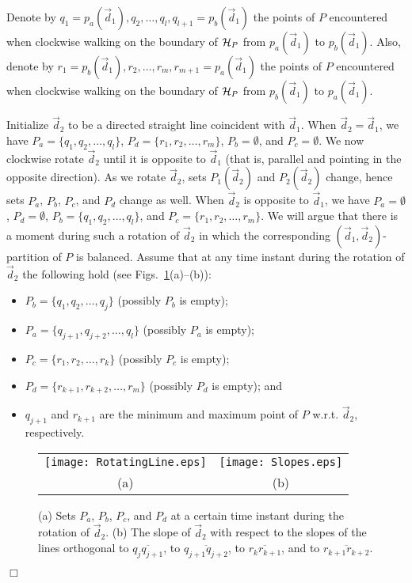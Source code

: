 \documentclass{llncs}
\renewenvironment{proof}
{{\bf Proof:}}{\hspace*{\fill}$\Box$\par\vspace{2mm}}
\begin{document}
\begin{proof}
Denote by $q_1=p_a({\vec d}_1),q_2,\dots,q_l,q_{l+1}=p_b({\vec d}_1)$ the points of $P$ encountered when clockwise walking on the boundary of ${\cal H}_P$ from $p_a({\vec d}_1)$ to $p_b({\vec d}_1)$. Also, denote by $r_1=p_b({\vec d}_1),r_2,\dots,r_m,r_{m+1}=p_a({\vec d}_1)$ the points of $P$ encountered when clockwise walking on the boundary of ${\cal H}_P$ from $p_b({\vec d}_1)$ to $p_a({\vec d}_1)$.

Initialize ${\vec d}_2$ to be a directed straight line coincident with ${\vec d}_1$. When ${\vec d}_2={\vec d}_1$, we have $P_a=\{q_1,q_2,\dots,q_l\}$, $P_d=\{r_1,r_2,\dots,r_m\}$, $P_b=\emptyset$, and $P_c=\emptyset$. We now clockwise rotate ${\vec d}_2$ until it is opposite to ${\vec d}_1$ (that is, parallel and pointing in the opposite direction). As we rotate ${\vec d}_2$, sets $P_{1}({\vec d}_2)$ and $P_{2}({\vec d}_2)$ change, hence sets $P_a$, $P_b$, $P_c$, and $P_d$ change as well. When ${\vec d}_2$ is opposite to ${\vec d}_1$, we have $P_a=\emptyset$, $P_d=\emptyset$, $P_b=\{q_1,q_2,\dots,q_l\}$, and $P_c=\{r_1,r_2,\dots,r_m\}$. We will argue that there is a moment during such a rotation of ${\vec d}_2$ in which the corresponding $({\vec d}_1,{\vec d}_2)$-partition of $P$ is balanced. Assume that at any time instant during the rotation of ${\vec d}_2$ the following hold (see Figs.~\ref{fig:rotating}(a)--(b)):

\begin{itemize}
\item $P_b=\{q_1,q_2,\dots,q_j\}$ (possibly $P_b$ is empty);
\item $P_a=\{q_{j+1},q_{j+2},\dots,q_l\}$ (possibly $P_a$ is empty);
\item $P_c=\{r_1,r_2,\dots,r_k\}$ (possibly $P_c$ is empty);
\item $P_d=\{r_{k+1},r_{k+2},\dots,r_m\}$ (possibly $P_d$ is empty); and
\item $q_{j+1}$ and $r_{k+1}$ are the minimum and maximum point of $P$ w.r.t. ${\vec d}_2$, respectively.
\end{itemize}


\begin{figure}[tb]
\begin{center}
\begin{tabular}{c c}
\mbox{\texttt{[image: RotatingLine.eps]}} & \hspace{5mm}
\mbox{\texttt{[image: Slopes.eps]}}\\
(a) \hspace{5mm} & \hspace{5mm} (b)
\end{tabular}
\caption{(a) Sets $P_a$, $P_b$, $P_c$, and $P_d$ at a certain time instant during the rotation of ${\vec d}_2$. (b) The slope of ${\vec d}_2$ with respect to the slopes of the lines orthogonal to $\overline{q_{j}q_{j+1}}$, to $\overline{q_{j+1}q_{j+2}}$, to $\overline{r_{k}r_{k+1}}$, and to $\overline{r_{k+1}r_{k+2}}$.}
\label{fig:rotating}
\end{center}
\end{figure}


\end{proof}
\end{document}
